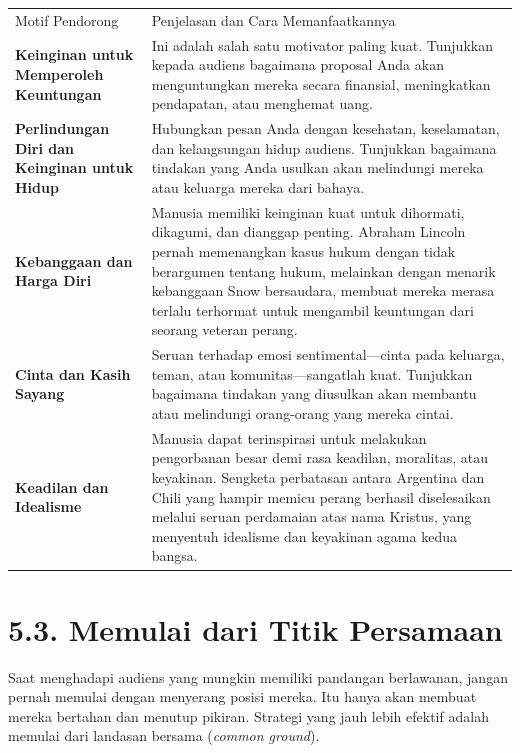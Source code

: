 \documentclass[
  letterpaper,
  DIV=11,
  numbers=noendperiod]{scrreprt}
\begin{document}
\begin{longtable}[]{@{}
  >{\raggedright\arraybackslash}p{}
  >{\raggedright\arraybackslash}p{}@{}}
\toprule\noalign{}
\endhead
\bottomrule\noalign{}
\endlastfoot
Motif Pendorong & Penjelasan dan Cara Memanfaatkannya \\
\textbf{Keinginan untuk Memperoleh Keuntungan} & Ini adalah salah satu
motivator paling kuat. Tunjukkan kepada audiens bagaimana proposal Anda
akan menguntungkan mereka secara finansial, meningkatkan pendapatan,
atau menghemat uang. \\
\textbf{Perlindungan Diri dan Keinginan untuk Hidup} & Hubungkan pesan
Anda dengan kesehatan, keselamatan, dan kelangsungan hidup audiens.
Tunjukkan bagaimana tindakan yang Anda usulkan akan melindungi mereka
atau keluarga mereka dari bahaya. \\
\textbf{Kebanggaan dan Harga Diri} & Manusia memiliki keinginan kuat
untuk dihormati, dikagumi, dan dianggap penting. Abraham Lincoln pernah
memenangkan kasus hukum dengan tidak berargumen tentang hukum, melainkan
dengan menarik kebanggaan Snow bersaudara, membuat mereka merasa terlalu
terhormat untuk mengambil keuntungan dari seorang veteran perang. \\
\textbf{Cinta dan Kasih Sayang} & Seruan terhadap emosi
sentimental---cinta pada keluarga, teman, atau komunitas---sangatlah
kuat. Tunjukkan bagaimana tindakan yang diusulkan akan membantu atau
melindungi orang-orang yang mereka cintai. \\
\textbf{Keadilan dan Idealisme} & Manusia dapat terinspirasi untuk
melakukan pengorbanan besar demi rasa keadilan, moralitas, atau
keyakinan. Sengketa perbatasan antara Argentina dan Chili yang hampir
memicu perang berhasil diselesaikan melalui seruan perdamaian atas nama
Kristus, yang menyentuh idealisme dan keyakinan agama kedua bangsa. \\
\end{longtable}

\section{\texorpdfstring{\textbf{5.3. Memulai dari Titik
Persamaan}}{5.3. Memulai dari Titik Persamaan}}\label{memulai-dari-titik-persamaan}

Saat menghadapi audiens yang mungkin memiliki pandangan berlawanan,
jangan pernah memulai dengan menyerang posisi mereka. Itu hanya akan
membuat mereka bertahan dan menutup pikiran. Strategi yang jauh lebih
efektif adalah memulai dari landasan bersama (\emph{common ground}).
\end{document}
